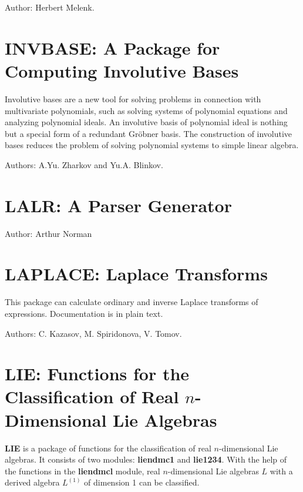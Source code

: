 Author: Herbert Melenk.



\newpage
\fi

\section{INVBASE: A Package for Computing Involutive Bases}

Involutive bases are a new tool for solving problems in connection with
multivariate polynomials, such as solving systems of polynomial equations
and analyzing polynomial ideals.  An involutive basis of polynomial ideal
is nothing but a special form of a redundant Gr\"obner basis.  The
construction of involutive bases reduces the problem of solving polynomial
systems to simple linear algebra.

Authors: A.Yu. Zharkov and Yu.A. Blinkov.



\newpage

\section{LALR: A Parser Generator}

Author: Arthur Norman



\newpage

\section{LAPLACE: Laplace Transforms}

This package can calculate ordinary and inverse Laplace transforms of
expressions.  Documentation is in plain text.

Authors: C. Kazasov, M. Spiridonova, V. Tomov.



\newpage

\section{LIE: Functions for the Classification of Real \texorpdfstring{$n$}{n}-Dimensional Lie
Algebras}

\textbf{LIE} is a package of functions for the classification of real
$n$-dimensional Lie algebras.  It consists of two modules: \textbf{liendmc1}
and \textbf{lie1234}.  With the help of the functions in the \textbf{liendmcl}
module, real $n$-dimensional Lie algebras $L$ with a derived algebra
$L^{(1)}$ of dimension 1 can be classified.

